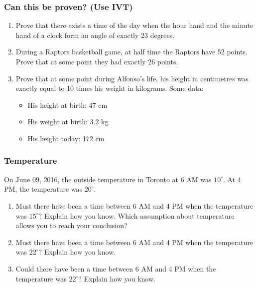 \begin{frame}[t]
	\frametitle{Can this be proven? (Use IVT)}
	\fontsize{13}{13}\selectfont
	\begin{enumerate}
		\item Prove that there exists a time of the day when the hour hand and the minute
			hand of a clock form an angle of exactly 23 degrees.

			\vfill

		\item During a Raptors basketball game, at half time the Raptors have 52
			points. Prove that at some point they had exactly 26 points.

			\vfill

		\item Prove that at some point during Alfonso's life, his height in
			centimetres was exactly equal to 10 times his weight in kilograms. Some data:
			\begin{itemize}
				\item His height at birth: 47 cm

				\item His weight at birth: 3.2 kg

				\item His height today: 172 cm
			\end{itemize}
			\vfill
	\end{enumerate}
\end{frame}

\begin{frame}
	\frametitle{Temperature}

	On June 09, 2016, the outside temperature in Toronto at 6 AM was $10^{\circ}$.
	At 4 PM, the temperature was $20^{\circ}$.

	\begin{enumerate}
		\item Must there have been a time between 6 AM and 4 PM when the temperature
			was $15^{\circ}$? Explain how you know. Which assumption about temperature
			allows you to reach your conclusion?

		\item Must there have been a time between 6 AM and 4 PM when the temperature
			was $22^{\circ}$? Explain how you know.

		\item Could there have been a time between 6 AM and 4 PM when the temperature
			was $22^{\circ}$? Explain how you know.
	\end{enumerate}
\end{frame}

